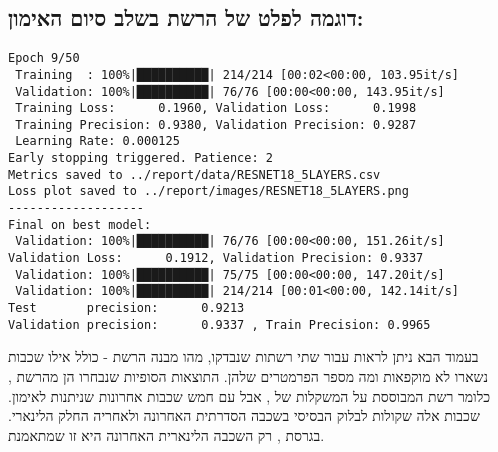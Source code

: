 \HE 
\subsection*{דוגמה לפלט של הרשת בשלב סיום האימון:}
\EN
\begin{tcolorbox}[colframe=black, colback=gray!5, boxrule=0.5mm, sharp corners]
\begin{verbatim}
Epoch 9/50
 Training  : 100%|██████████| 214/214 [00:02<00:00, 103.95it/s]
 Validation: 100%|██████████| 76/76 [00:00<00:00, 143.95it/s]
 Training Loss:      0.1960, Validation Loss:      0.1998
 Training Precision: 0.9380, Validation Precision: 0.9287
 Learning Rate: 0.000125
Early stopping triggered. Patience: 2
Metrics saved to ../report/data/RESNET18_5LAYERS.csv
Loss plot saved to ../report/images/RESNET18_5LAYERS.png
-------------------
Final on best model:
 Validation: 100%|██████████| 76/76 [00:00<00:00, 151.26it/s]
Validation Loss:      0.1912, Validation Precision: 0.9337
 Validation: 100%|██████████| 75/75 [00:00<00:00, 147.20it/s]
 Validation: 100%|██████████| 214/214 [00:01<00:00, 142.14it/s]
Test       precision:      0.9213
Validation precision:      0.9337 , Train Precision: 0.9965

\end{verbatim}
\end{tcolorbox}

\HE
בעמוד הבא ניתן לראות עבור שתי רשתות שנבדקו, מהו מבנה הרשת - כולל אילו שכבות נשארו לא מוקפאות ומה מספר הפרמטרים שלהן.\newline
התוצאות הסופיות שנבחרו הן מהרשת  , כלומר רשת המבוססת על המשקלות של , אבל עם חמש שכבות אחרונות שניתנות לאימון. שכבות אלה שקולות לבלוק הבסיסי בשכבה הסדרתית האחרונה ולאחריה החלק הלינארי.\newline
בגרסת , רק השכבה הלינארית האחרונה היא זו שמתאמנת.

\lstset{
    basicstyle=\ttfamily\tiny, %
    keywordstyle=\bfseries, %
    showstringspaces=false,
    breaklines=true, %
    breakatwhitespace=true, %
    breakindent=0pt, %
    columns=fullflexible, %
    frame=single, %
    numbers=none, %
    xleftmargin=10pt,
    xrightmargin=10pt,
    aboveskip=5pt, %
    belowskip=5pt, %
}

\newcommand{\vertline}{\textbar} %
\newcommand{\cornerline}{\rule{1.5ex}{0.4pt}} %
\newcommand{\branch}{\textbar\cornerline} %


